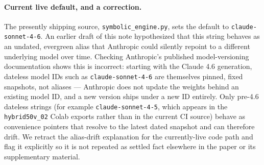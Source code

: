 \paragraph{Current live default, and a correction.} The presently shipping
source, \texttt{symbolic\_engine.py}, sets the default to
\texttt{claude-sonnet-4-6}. An earlier draft of this note hypothesized that
this string behaves as an undated, evergreen alias that Anthropic could
silently repoint to a different underlying model over time. Checking
Anthropic's published model-versioning documentation shows this is
incorrect: starting with the Claude 4.6 generation, dateless model IDs such
as \texttt{claude-sonnet-4-6} are themselves pinned, fixed snapshots, not
aliases — Anthropic does not update the weights behind an existing model
ID, and a new version ships under a new ID entirely. Only pre-4.6 dateless
strings (for example \texttt{claude-sonnet-4-5}, which appears in the
\texttt{hybrid50v\_02} Colab exports rather than in the current CI source)
behave as convenience pointers that resolve to the latest dated snapshot
and can therefore drift. We retract the alias-drift explanation for the
currently-live code path and flag it explicitly so it is not repeated as
settled fact elsewhere in the paper or its supplementary material.

